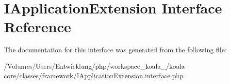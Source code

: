 \hypertarget{interface_i_application_extension}{
\section{IApplicationExtension Interface Reference}
\label{interface_i_application_extension}
}


The documentation for this interface was generated from the following file:\begin{DoxyCompactItemize}
\item 
/Volumes/Users/Entwicklung/php/workspace\_\-koala\_/koala-\/core/classes/framework/IApplicationExtension.interface.php\end{DoxyCompactItemize}
